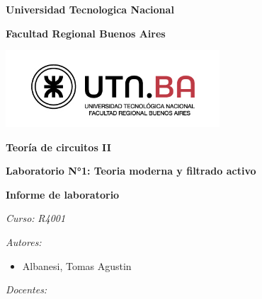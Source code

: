 \documentclass[main.tex]{subfiles}
\begin{document}
	
	\onecolumn
	
	\begin{center}
		\textbf{\fontsize{14}{\baselineskip}\selectfont Universidad Tecnologica Nacional}
		
		\bigskip
		\bigskip
		
		\textbf{\fontsize{14}{\baselineskip}\selectfont Facultad Regional Buenos Aires}
		
		\bigskip
		\bigskip
		
		\includegraphics[width=8cm]{./../Imagenes/utn-logo.jpg}
		
		\bigskip
		\bigskip
		
		\textbf{\fontsize{20}{\baselineskip}\selectfont Teoría de circuitos II}
		
		\bigskip
		\bigskip
		\bigskip
		\bigskip
		
		\textbf{\fontsize{18}{\baselineskip}\selectfont Laboratorio N°1: Teoria moderna y filtrado activo}
		
		\bigskip
		\bigskip
		\bigskip
		\bigskip
		
		\textbf{\fontsize{18}{\baselineskip}\selectfont Informe de laboratorio}
		
		\bigskip
		\bigskip
		\bigskip
		
		\vspace{2cm}
		
		\raggedright
		\textit{\fontsize{14}{\baselineskip}\selectfont Curso: }
		\textit{\fontsize{14}{\baselineskip}\selectfont R4001}
		
		\bigskip
		\bigskip
		
		\raggedright
		\textit{\fontsize{14}{\baselineskip}\selectfont Autores:}
		
		\bigskip
		
		\begin{itemize}{}
			\item \fontsize{14}{\baselineskip}\selectfont Albanesi, Tomas Agustin
		\end{itemize}
		
		\bigskip
		\bigskip
		
		\raggedright
		\textit{\fontsize{14}{\baselineskip}\selectfont Docentes:}
		
		\bigskip
		

\end{center}
\end{document}
